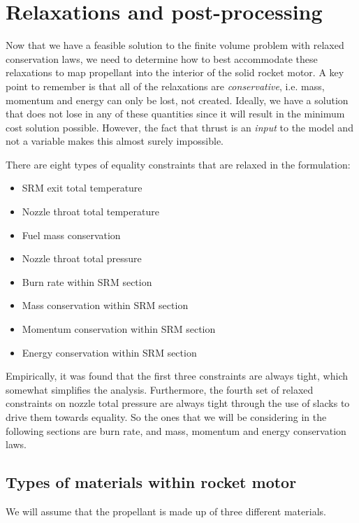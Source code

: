 \section{Relaxations and post-processing}
\label{sec:relaxations}

Now that we have a feasible solution to the finite volume problem
with relaxed conservation laws, we need to determine how to best
accommodate these relaxations to map propellant into the interior of
the solid rocket motor. A key point to remember is that all of the relaxations are \emph{conservative},
i.e. mass, momentum and energy can only be lost, not created. Ideally,
we have a solution that does not lose in any of these quantities since it will
result in the minimum cost solution possible. However, the fact that thrust is an \emph{input}
to the model and not a variable makes this almost surely impossible.

There are eight types of equality constraints that are relaxed in the formulation:
\begin{itemize}
    \item SRM exit total temperature
    \item Nozzle throat total temperature
    \item Fuel mass conservation
    \item Nozzle throat total pressure
    \item Burn rate within SRM section
    \item Mass conservation within SRM section
    \item Momentum conservation within SRM section
    \item Energy conservation within SRM section
\end{itemize}

Empirically, it was found that the first three constraints are always tight, which
somewhat simplifies the analysis. Furthermore, the fourth set of relaxed constraints
on nozzle total pressure are always tight through the use of slacks to drive them
towards equality.
So the ones that we will be considering in the following sections are burn rate, and
mass, momentum and energy conservation laws.

\subsection{Types of materials within rocket motor}

We will assume that the propellant is made up of three different materials.

